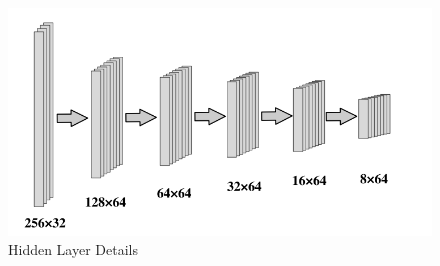 \documentclass[12pt,two side]{report}
\begin{document}
\begin{figure}
\centering
\includegraphics[width=12cm]{background_report/figures/hidden layer.png}
\caption{Hidden Layer Details}
\label{figure:8}
\end{figure}

\end{document}
